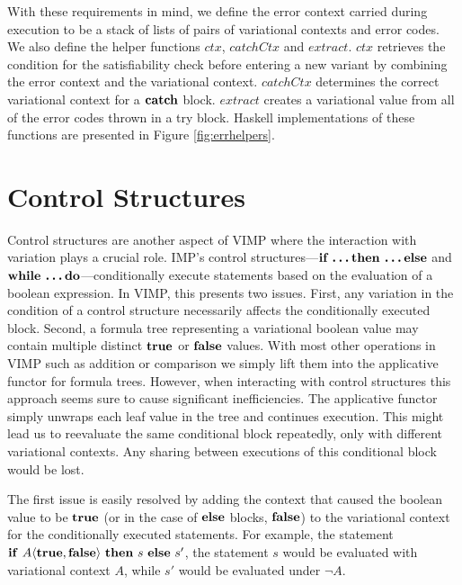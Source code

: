 \documentclass[12pt,oneside]{book}
\newcommand{\tagtree}[3]{#1 \langle #2, #3 \rangle}
\begin{document}
With these requirements in mind, we define the error context carried during execution to be a stack of lists of pairs of variational contexts and error codes.
We also define the helper functions $\mathit{ctx}$, $\mathit{catchCtx}$ and $\mathit{extract}$. $\mathit{ctx}$ retrieves the condition for the satisfiability check
before entering a new variant by combining the error context and the variational context. $\mathit{catchCtx}$ determines the correct variational context for a $\textbf{\textup{\textrm{catch}}}$
block. $\mathit{extract}$ creates a variational value from all of the error codes thrown in a try block. Haskell implementations of these functions are presented in Figure \ref{fig:errhelpers}.

\section{Control Structures}
\label{sec:control}

Control structures are another aspect of VIMP where the interaction with variation plays a crucial role. IMP's control structures---$\textbf{\textup{\textrm{if \ldots then \ldots else}}}$ and $\textbf{\textup{\textrm{while \ldots do}}}$---conditionally execute statements based on the evaluation of a boolean expression. In VIMP, this presents two issues. First, any variation in the condition of a control structure
necessarily affects the conditionally executed block. Second, a formula tree representing a variational boolean
value may contain multiple distinct $\textbf{\textup{\textrm{true}}}$ or $\textbf{\textup{\textrm{false}}}$ values. With most other operations in VIMP such as addition or comparison we simply lift them into the applicative functor for formula trees.
However, when interacting with control structures this approach seems sure to cause significant inefficiencies. The applicative functor simply unwraps each leaf value in the tree
and continues execution. This might lead us to reevaluate the same conditional block repeatedly, only with different variational contexts. Any sharing between executions of this
conditional block would be lost. 

The first issue is easily resolved by adding the context that caused the boolean value to be $\textbf{\textup{\textrm{true}}}$ (or in the case of $\textbf{\textup{\textrm{else}}}$ blocks, $\textbf{\textup{\textrm{false}}}$)
to the variational context for the conditionally executed statements. For example, the statement
$\CCkeyw{if}\ \tagtree{A}{\CCkeyw{true}}{\CCkeyw{false}}\ \CCkeyw{then}\ s\ \CCkeyw{else}\ s'$, the statement $s$ would be evaluated with variational context $A$, while
$s'$ would be evaluated under $\neg A$.
\end{document}

